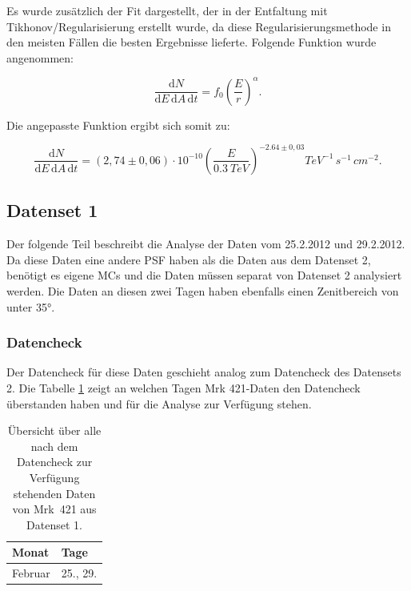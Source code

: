 Es wurde zusätzlich der Fit dargestellt, der in der Entfaltung mit Tikhonov\-/Regularisierung erstellt wurde, da diese Regularisierungsmethode in den meisten Fällen die besten Ergebnisse lieferte.
Folgende Funktion wurde angenommen:

\begin{equation}
 \frac{\mathrm{d}N}{\mathrm{d}E\,\mathrm{d}A\,\mathrm{d}t}=f_0\left( \frac{E}{r} \right)^\alpha.
\end{equation}

Die angepasste Funktion ergibt sich somit zu:

\begin{equation}
 \frac{\mathrm{d}N}{\mathrm{d}E\,\mathrm{d}A\,\mathrm{d}t}=(2,74 \pm 0,06) \cdot 10^{-10}\left( \frac{E}{\SI{0,3}{TeV}} \right)^{-2.64 \pm 0,03} \si{TeV^{-1}\,s^{-1}\,cm^{-2}}.
\end{equation}


\FloatBarrier

\subsection{Datenset 1}
\label{subsec:Datenset_1}
Der folgende Teil beschreibt die Analyse der Daten vom 25.2.2012 und 29.2.2012.
Da diese Daten eine andere PSF haben als die Daten aus dem Datenset 2, benötigt es eigene MCs und die Daten müssen separat von Datenset 2 analysiert werden.
Die Daten an diesen zwei Tagen haben ebenfalls einen Zenitbereich von unter 35°.

\subsubsection{Datencheck}
Der Datencheck für diese Daten geschieht analog zum Datencheck des Datensets 2. 
Die Tabelle \ref{tab:Datenset1-Mrk421} zeigt an welchen Tagen Mrk 421-Daten den Datencheck überstanden haben und für die Analyse zur Verfügung stehen. 

\begin{table}[!h]
\centering
\caption{Übersicht über alle nach dem Datencheck zur Verfügung stehenden Daten von Mrk~421 aus Datenset 1.}
\label{tab:Datenset1-Mrk421}
\begin{tabular}{ll}
  \toprule
  Monat & Tage\\
  \midrule
  \midrule
Februar & 25., 29.\\
  \bottomrule
\end{tabular}
\end{table}


